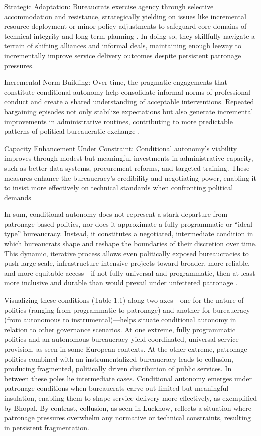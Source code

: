 Strategic Adaptation:
Bureaucrats exercise agency through selective accommodation and resistance, strategically yielding on issues like incremental resource deployment or minor policy adjustments to safeguard core domains of technical integrity and long-term planning \citep{pepinsky_bureaucracy_2017, auerbach_clients_2019}. In doing so, they skillfully navigate a terrain of shifting alliances and informal deals, maintaining enough leeway to incrementally improve service delivery outcomes despite persistent patronage pressures.

Incremental Norm-Building:
Over time, the pragmatic engagements that constitute conditional autonomy help consolidate informal norms of professional conduct and create a shared understanding of acceptable interventions. Repeated bargaining episodes not only stabilize expectations but also generate incremental improvements in administrative routines, contributing to more predictable patterns of political-bureaucratic exchange \citep{levi_rule_1988, fukuyama_governance:_2016}.

Capacity Enhancement Under Constraint:
Conditional autonomy’s viability improves through modest but meaningful investments in administrative capacity, such as better data systems, procurement reforms, and targeted training. These measures enhance the bureaucracy’s credibility and negotiating power, enabling it to insist more effectively on technical standards when confronting political demands \citep{hawes_political-bureaucratic_2008, scott_seeing_1998}

In sum, conditional autonomy does not represent a stark departure from patronage-based politics, nor does it approximate a fully programmatic or “ideal-type” bureaucracy. Instead, it constitutes a negotiated, intermediate condition in which bureaucrats shape and reshape the boundaries of their discretion over time. This dynamic, iterative process allows even politically exposed bureaucracies to push large-scale, infrastructure-intensive projects toward broader, more reliable, and more equitable access—if not fully universal and programmatic, then at least more inclusive and durable than would prevail under unfettered patronage \citep{ hicken_building_2009}.

Visualizing these conditions (Table 1.1) along two axes—one for the nature of politics (ranging from programmatic to patronage) and another for bureaucracy (from autonomous to instrumental)—helps situate conditional autonomy in relation to other governance scenarios. At one extreme, fully programmatic politics and an autonomous bureaucracy yield coordinated, universal service provision, as seen in some European contexts. At the other extreme, patronage politics combined with an instrumentalized bureaucracy leads to collusion, producing fragmented, politically driven distribution of public services. In between these poles lie intermediate cases. Conditional autonomy emerges under patronage conditions when bureaucrats carve out limited but meaningful insulation, enabling them to shape service delivery more effectively, as exemplified by Bhopal. By contrast, collusion, as seen in Lucknow, reflects a situation where patronage pressures overwhelm any normative or technical constraints, resulting in persistent fragmentation.

